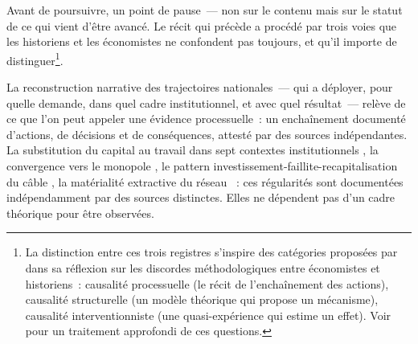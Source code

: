 
Avant de poursuivre, un point de pause~--- non sur le contenu mais sur le statut de ce qui vient d'être avancé. Le récit qui précède a procédé par trois voies que les historiens et les économistes ne confondent pas toujours, et qu'il importe de distinguer\footnote{La distinction entre ces trois registres s'inspire des catégories proposées par \textcite{monnet_perspectives_2025} dans sa réflexion sur les discordes méthodologiques entre économistes et historiens~: causalité processuelle (le récit de l'enchaînement des actions), causalité structurelle (un modèle théorique qui propose un mécanisme), causalité interventionniste (une quasi-expérience qui estime un effet). Voir \textcite[ch.~6--8]{trannoy_economistes_2025} pour un traitement approfondi de ces questions.}.

La reconstruction narrative des trajectoires nationales~--- qui a déployer, pour quelle demande, dans quel cadre institutionnel, et avec quel résultat~--- relève de ce que l'on peut appeler une évidence processuelle~: un enchaînement documenté d'actions, de décisions et de conséquences, attesté par des sources indépendantes. La substitution du capital au travail dans sept contextes institutionnels \parencite{gordon_capital_nineteenth, holzmann_early_1995, gabler_american_1988}, la convergence vers le monopole \parencite{wu2010master, nonnenmacher_telegraph_2001, kieve_electric_1973, bertho_histoire_1984}, le pattern investissement-faillite-recapitalisation du câble \parencite{gordon_thread_2002, headrick_invisible_1991}, la matérialité extractive du réseau \parencite{fitzmaurice_material_2023, tully_victorian_2009}~: ces régularités sont documentées indépendamment par des sources distinctes. Elles ne dépendent pas d'un cadre théorique pour être observées.

